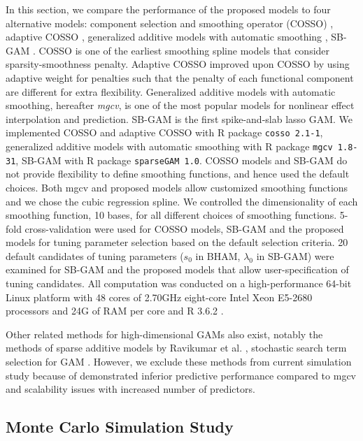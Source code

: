 \documentclass[AMA,STIX1COL,]{WileyNJD-v2}
\begin{document}
In this section, we compare the performance of the proposed models to
four alternative models: component selection and smoothing operator
(COSSO) \citep{Zhang2006GAM}, adaptive COSSO \citep{Storlie2011},
generalized additive models with automatic smoothing \citep{Wood2011},
SB-GAM \citep{Bai2021}. COSSO is one of the earliest smoothing spline
models that consider sparsity-smoothness penalty. Adaptive COSSO
improved upon COSSO by using adaptive weight for penalties such that the
penalty of each functional component are different for extra
flexibility. Generalized additive models with automatic smoothing,
hereafter \textit{mgcv}, is one of the most popular models for nonlinear
effect interpolation and prediction. SB-GAM is the first spike-and-slab
lasso GAM. We implemented COSSO and adaptive COSSO with R package
\texttt{cosso 2.1-1}, generalized additive models with automatic
smoothing with R package \texttt{mgcv 1.8-31}, SB-GAM with R package
\texttt{sparseGAM 1.0}. COSSO models and SB-GAM do not provide
flexibility to define smoothing functions, and hence used the default
choices. Both mgcv and proposed models allow customized smoothing
functions and we chose the cubic regression spline. We controlled the
dimensionality of each smoothing function, 10 bases, for all different
choices of smoothing functions. 5-fold cross-validation were used for
COSSO models, SB-GAM and the proposed models for tuning parameter
selection based on the default selection criteria. 20 default candidates
of tuning parameters (\(s_0\) in BHAM, \(\lambda_0\) in SB-GAM) were
examined for SB-GAM and the proposed models that allow
user-specification of tuning candidates. All computation was conducted
on a high-performance 64-bit Linux platform with 48 cores of 2.70GHz
eight-core Intel Xeon E5-2680 processors and 24G of RAM per core and R
3.6.2 \citep{R}.

Other related methods for high-dimensional GAMs also exist, notably the
methods of sparse additive models by Ravikumar et al.
\citep{Ravikumar2009}, stochastic search term selection for GAM
\citep{Scheipl2012}. However, we exclude these methods from current
simulation study because of demonstrated inferior predictive performance
compared to mgcv and scalability issues with increased number of
predictors. \citep{Scheipl2013}

\hypertarget{monte-carlo-simulation-study}{%
\subsection{Monte Carlo Simulation
Study}\label{monte-carlo-simulation-study}}
\end{document}
